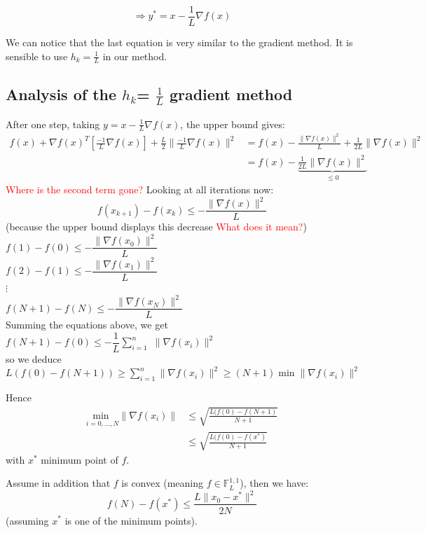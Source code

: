 $$ \Rightarrow y^{*} = x- \frac{1}{L} \nabla f(x)$$

We can notice that the last equation is very similar to the gradient method. It is sensible to use $h_k=\frac{1}{L}$ in our method. 

\subsection{Analysis of the $h_{k}$= $\frac{1}{L}$ gradient method}
 
After one step, taking  $y= x-\frac{1}{L}\nabla f(x)$, the upper bound gives:
\begin{align*}
f(x) + \nabla f(x)^{T} [\frac{-1}{L} \nabla f(x)]+\frac{L}{2} \|  \frac{-1}{L}\nabla f(x)\|^2
& =f(x)- \frac{\|\nabla f(x)\|^{2}}{L}+\frac{1}{2L} \|\nabla f(x)\|^{2} \\
& =f(x)-\underbrace{\frac{1}{2L} \|\nabla f(x)\|^{2}}_{\leq 0}
\end{align*}
\textcolor{red}{Where is the second term gone?}
Looking at all iterations now:
$$ f(x_{k+1})-f(x_{k}) \leq - \frac{\|\nabla f(x)\|^{2}}{L}$$
(because the upper bound displays this decrease \textcolor{red}{What does it mean?})\\


$f(1)-f(0) \leq -\dfrac{\|\nabla f(x_{0})\|^{2}}{L}$\\
$f(2)-f(1) \leq -\dfrac{\|\nabla f(x_{1})\|^{2}}{L}$ \\
$\vdots$ \\
$f(N+1)-f(N) \leq -\dfrac{\|\nabla f(x_{N})\|^{2}}{L}$\\

Summing the equations above, we get \\
$f(N+1)-f(0) \leq - \dfrac{1}{L} \sum\limits_{i=1}^{n}$ $\|\nabla f(x_{i})\|^{2}$\\
so we deduce \\
$L(f(0)-f(N+1)) \geq \sum\limits_{i=1}^{n} \|\nabla f(x_{i})\|^{2} \geq (N+1) \min \|\nabla f(x_{i})\|^{2}$

Hence
\begin{align*}
\underset{i=0,...,N}{\text{min }} \|\nabla f(x_{i})\| & \leq \sqrt{\frac{L(f(0)-f(N+1)}{N+1}} \\
& \leq \sqrt{\frac{L(f(0)-f(x^*)}{N+1}}
\end{align*}
with $x^*$ minimum point of $f$.

\begin{lemma}
Assume in addition that $f$ is convex (meaning $f \in \mathbb{F}^{1,1}_{L}$)\footnotemark, then we have: 
$$ f(N)-f(x^*) \leq \frac{L\|x_{0}-x^*\|^{2}}{2N} $$ 
 (assuming $x^*$ is one of the minimum points).
\end{lemma}
 
